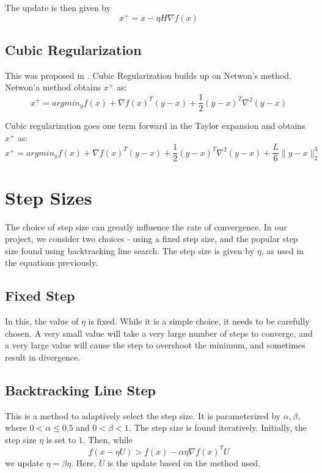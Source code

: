 \documentclass{article}
\begin{document}
The update is then given by
\begin{equation}
x^+ = x - \eta H \nabla f(x)
\end{equation}

\subsection{Cubic Regularization}
This was proposed in \citep{nesterov2006cubic}. Cubic Regularization builds up on Netwon's method. Netwon'a method obtains $x^+$ as:
\begin{equation}
	x^+ = argmin_y f(x) + \nabla f(x)^T (y-x) + \frac12 (y-x)^T \nabla^2 (y-x)
\end{equation}

Cubic regularization goes one term forward in the Taylor expansion and obtains $x^+$ as:
\begin{equation}
x^+ = argmin_y f(x) + \nabla f(x)^T (y-x) + \frac12 (y-x)^T \nabla^2 (y-x) + \frac{L}{6}\lVert y-x \rVert_2^3
\end{equation}

\section{Step Sizes}\label{step}
The choice of step size can greatly influence the rate of convergence. In our project, we consider two choices - using a fixed step size, and the popular step size found using backtracking line search. The step size is given by $\eta$, as used in the equations previously.

\subsection{Fixed Step}
In this, the value of $\eta$ is fixed. While it is a simple choice, it needs to be carefully chosen. A very small value will take a very large number of steps to converge, and a very large value will cause the step to overshoot the minimum, and sometimes result in divergence.

\subsection{Backtracking Line Step}
This is a method to adaptively select the step size. It is parameterized by $\alpha,\beta$, where $0<\alpha\le0.5$ and $0<\beta<1$. The step size is found iteratively. Initially, the step size $\eta$ is set to $1$. Then, while
\begin{equation}
f(x-\eta U) > f(x) - \alpha \eta \nabla f(x)^T U
\end{equation}
we update $\eta = \beta \eta$. Here, $U$ is the update based on the method used.
\end{document}
